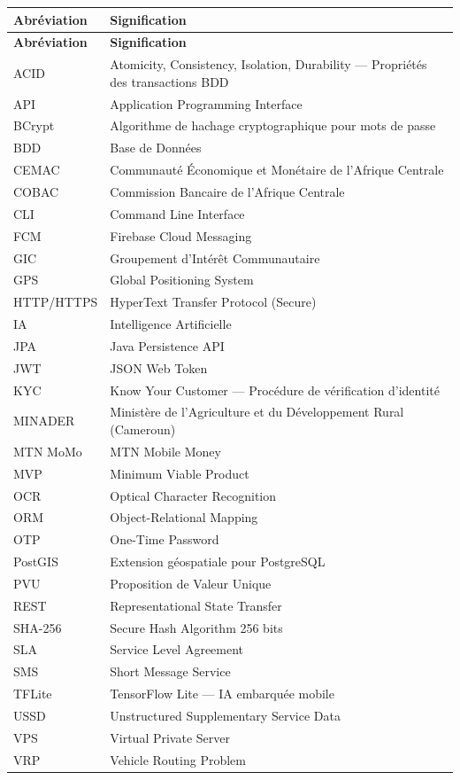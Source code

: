 \documentclass[12pt,a4paper]{report}
\begin{document}
\begin{longtable}{L{3cm} L{11cm}}
\toprule
\textbf{Abréviation} & \textbf{Signification} \\
\midrule
\endfirsthead
\toprule
\textbf{Abréviation} & \textbf{Signification} \\
\midrule
\endhead
\bottomrule
\endfoot
ACID & Atomicity, Consistency, Isolation, Durability — Propriétés des transactions BDD \\
API & Application Programming Interface \\
BCrypt & Algorithme de hachage cryptographique pour mots de passe \\
BDD & Base de Données \\
CEMAC & Communauté Économique et Monétaire de l'Afrique Centrale \\
COBAC & Commission Bancaire de l'Afrique Centrale \\
CLI & Command Line Interface \\
FCM & Firebase Cloud Messaging \\
GIC & Groupement d'Intérêt Communautaire \\
GPS & Global Positioning System \\
HTTP/HTTPS & HyperText Transfer Protocol (Secure) \\
IA & Intelligence Artificielle \\
JPA & Java Persistence API \\
JWT & JSON Web Token \\
KYC & Know Your Customer — Procédure de vérification d'identité \\
MINADER & Ministère de l'Agriculture et du Développement Rural (Cameroun) \\
MTN MoMo & MTN Mobile Money \\
MVP & Minimum Viable Product \\
OCR & Optical Character Recognition \\
ORM & Object-Relational Mapping \\
OTP & One-Time Password \\
PostGIS & Extension géospatiale pour PostgreSQL \\
PVU & Proposition de Valeur Unique \\
REST & Representational State Transfer \\
SHA-256 & Secure Hash Algorithm 256 bits \\
SLA & Service Level Agreement \\
SMS & Short Message Service \\
TFLite & TensorFlow Lite — IA embarquée mobile \\
USSD & Unstructured Supplementary Service Data \\
VPS & Virtual Private Server \\
VRP & Vehicle Routing Problem \\
\end{longtable}
\end{document}
